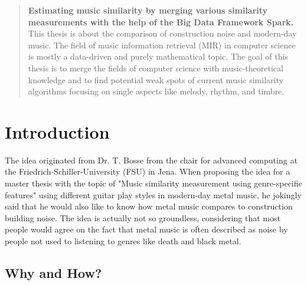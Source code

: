 \begin{abstract}
	\noindent \textbf{Estimating music similarity by merging various similarity measurements with the help of the Big Data Framework Spark.}\\
	This thesis is about the comparison of construction noise and modern-day music. 
	The field of music information retrieval (MIR) in computer science is mostly a data-driven and purely mathematical topic. The goal of this thesis is to merge the fields of computer science with music-theoretical knowledge and to find potential weak spots of current music similarity algorithms focusing on single aspects like melody, rhythm, and timbre. 

\end{abstract}


\mainmatter %

\chapter{Introduction}

The idea originated from Dr. T. Bosse from the chair for advanced computing at the Friedrich-Schiller-University (FSU) in Jena. When proposing the idea for a master thesis with the topic of "Music similarity measurement using genre-specific features" using different guitar play styles in modern-day metal music, he jokingly said that he would also like to know how metal music compares to construction building noise.
The idea is actually not so groundless, considering that most people would agree on the fact that metal music is often described as noise by people not used to listening to genres like death and black metal.

\section{Why and How?}

